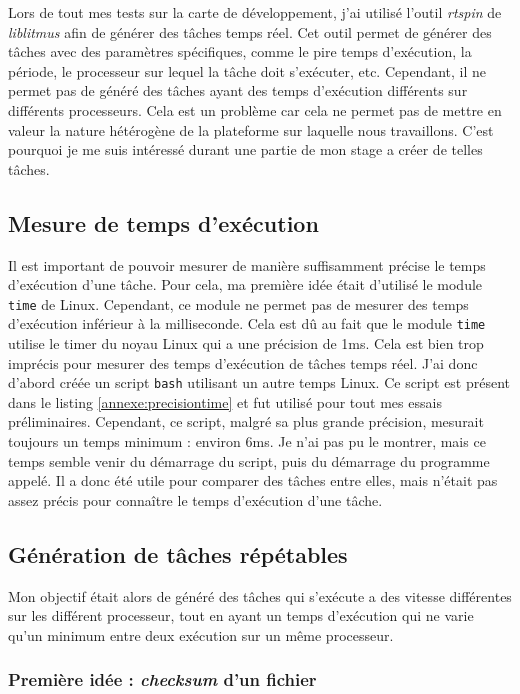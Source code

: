 Lors de tout mes tests sur la carte de développement, j'ai utilisé l'outil \textit{rtspin} de \textit{liblitmus} afin de générer des tâches temps réel. Cet outil permet de générer des tâches avec des paramètres spécifiques, comme le pire temps d'exécution, la période, le processeur sur lequel la tâche doit s'exécuter, etc. Cependant, il ne permet pas de généré des tâches ayant des temps d'exécution différents sur différents processeurs. Cela est un problème car cela ne permet pas de mettre en valeur la nature hétérogène de la plateforme sur laquelle nous travaillons. C'est pourquoi je me suis intéressé durant une partie de mon stage a créer de telles tâches.

\subsection{Mesure de temps d'exécution}
Il est important de pouvoir mesurer de manière suffisamment précise le temps d'exécution d'une tâche. Pour cela, ma première idée était d'utilisé le module \texttt{time} de Linux. Cependant, ce module ne permet pas de mesurer des temps d'exécution inférieur à la milliseconde. Cela est dû au fait que le module \texttt{time} utilise le timer du noyau Linux qui a une précision de 1ms. Cela est bien trop imprécis pour mesurer des temps d'exécution de tâches temps réel. J'ai donc d'abord créée un script \texttt{bash} utilisant un autre temps Linux. Ce script est présent dans le listing \ref{annexe:precisiontime} et fut utilisé pour tout mes essais préliminaires. Cependant, ce script, malgré sa plus grande précision, mesurait toujours un temps minimum : environ 6ms. Je n'ai pas pu le montrer, mais ce temps semble venir du démarrage du script, puis du démarrage du programme appelé. Il a donc été utile pour comparer des tâches entre elles, mais n'était pas assez précis pour connaître le temps d'exécution d'une tâche.


\subsection{Génération de tâches répétables}
\label{section:generation-taches-repetables}

Mon objectif était alors de généré des tâches qui s'exécute a des vitesse différentes sur les différent processeur, tout en ayant un temps d'exécution qui ne varie qu'un minimum entre deux exécution sur un même processeur.

\subsubsection{Première idée : \textit{checksum} d'un fichier}


